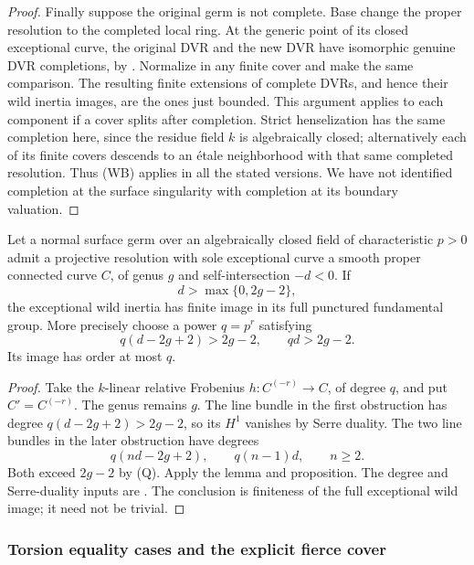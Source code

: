 \begin{proof}
Finally suppose the original germ is not complete.  Base
change the proper resolution to the completed local ring.
At the generic point of its closed exceptional curve, the
original DVR and the new DVR have isomorphic genuine DVR
completions, by \cite[Lemma 54.11.1, tag 0BG4]
{StacksBFiniteCone}.  Normalize in any finite cover and make
the same comparison.  The resulting finite extensions of
complete DVRs, and hence their wild inertia images, are the
ones just bounded.  This argument applies to each component
if a cover splits after completion.  Strict henselization
has the same completion here, since the residue field $k$ is
algebraically closed; alternatively each of its finite covers
descends to an \'etale neighborhood with that same completed
resolution.  Thus (WB) applies in all the stated versions.
We have not identified completion at the surface singularity
with completion at its boundary valuation.
\end{proof}

\begin{corollary}
\label{D:negative-curve-finite-wild}
Let a normal surface germ over an algebraically closed field
of characteristic $p>0$ admit a projective resolution with
sole exceptional curve a smooth proper connected curve $C$,
of genus $g$ and self-intersection $-d<0$.
If
\[
                         d>\max\{0,2g-2\},
\]
the exceptional wild inertia has finite image in its full
punctured fundamental group.  More precisely choose a power
$q=p^r$ satisfying
\[
 q(d-2g+2)>2g-2,\qquad qd>2g-2.
 \tag{Q}
\]
Its image has order at most $q$.
\end{corollary}

\begin{proof}
Take the $k$-linear relative Frobenius
$h:C^{(-r)}\to C$, of degree $q$, and put $C'=C^{(-r)}$.
The genus remains $g$.  The line bundle in the first
obstruction has degree $q(d-2g+2)>2g-2$, so its $H^1$
vanishes by Serre duality.  The two line bundles in the
later obstruction have degrees
\[
 q(nd-2g+2),\qquad q(n-1)d,\qquad n\geq2.
 \tag{FD}
\]
Both exceed $2g-2$ by (Q).  Apply the lemma and proposition.
The degree and Serre-duality inputs are
\cite[Lemmas 53.4.1 and 53.5.2, tags 0BS2 and 0BS6]
{StacksBNegativeCurve}.  The conclusion is finiteness of
the full exceptional wild image; it need not be trivial.
\end{proof}

\subsubsection{Torsion equality cases and the explicit fierce cover}

